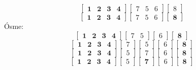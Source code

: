 \documentclass[10pt, oneside]{article}
\theoremstyle{remark}
\begin{document}
$$\begin{bmatrix} \mathbf{1} & \mathbf{2} & \mathbf{3} & \mathbf{4} \end{bmatrix} \begin{bmatrix} 7 & 5 & 6 \end{bmatrix} \begin{bmatrix} 8 \end{bmatrix}$$
$$\begin{bmatrix} \mathbf{1} & \mathbf{2} & \mathbf{3} & \mathbf{4} \end{bmatrix} \begin{bmatrix} 7 & 5 & 6 \end{bmatrix} \begin{bmatrix} \mathbf{8} \end{bmatrix}$$
Ósme:
$$\begin{bmatrix} \mathbf{1} & \mathbf{2} & \mathbf{3} & \mathbf{4} \end{bmatrix} \begin{bmatrix} 7 & 5 \end{bmatrix} \begin{bmatrix} 6 \end{bmatrix} \begin{bmatrix}\mathbf{8} \end{bmatrix}$$
$$\begin{bmatrix} \mathbf{1} & \mathbf{2} & \mathbf{3} & \mathbf{4} \end{bmatrix} \begin{bmatrix} 7 \end{bmatrix} \begin{bmatrix} 5 \end{bmatrix} \begin{bmatrix} 6 \end{bmatrix} \begin{bmatrix}\mathbf{8} \end{bmatrix}$$
$$\begin{bmatrix} \mathbf{1} & \mathbf{2} & \mathbf{3} & \mathbf{4} \end{bmatrix} \begin{bmatrix} 5 \end{bmatrix} \begin{bmatrix} 7 \end{bmatrix} \begin{bmatrix} 6 \end{bmatrix} \begin{bmatrix}\mathbf{8} \end{bmatrix}$$
$$\begin{bmatrix} \mathbf{1} & \mathbf{2} & \mathbf{3} & \mathbf{4} \end{bmatrix} \begin{bmatrix} 5 \end{bmatrix} \begin{bmatrix} \mathbf{7} \end{bmatrix} \begin{bmatrix} 6 \end{bmatrix} \begin{bmatrix}\mathbf{8} \end{bmatrix}$$
\end{document}
